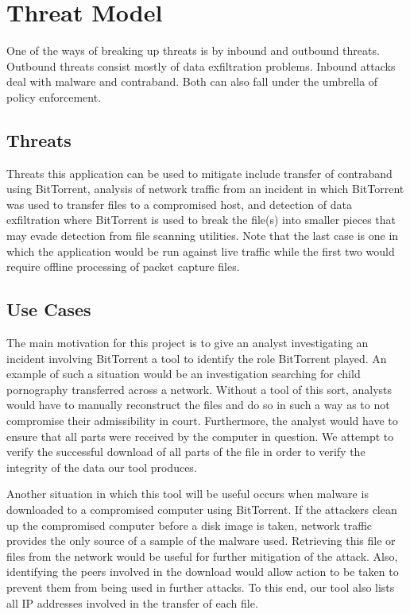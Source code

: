 \documentclass{acm_proc_article-sp}
\begin{document}
\section{Threat Model}
One of the ways of breaking up threats is by inbound and outbound threats.
Outbound threats consist mostly of data exfiltration problems.  Inbound attacks
deal with malware and contraband.  Both can also fall under the umbrella of
policy enforcement.

\subsection{Threats}
Threats this application can be used to mitigate include transfer of contraband
using BitTorrent, analysis of network traffic from an incident in which
BitTorrent was used to transfer files to a compromised host, and detection of
data exfiltration where BitTorrent is used to break the file(s) into smaller
pieces that may evade detection from file scanning utilities. Note that the
last case is one in which the application would be run against live traffic
while the first two would require offline processing of packet capture files.


\subsection{Use Cases}
The main motivation for this project is to give an analyst investigating an
incident involving BitTorrent a tool to identify the role BitTorrent played.  An
example of such a situation would be an investigation searching for child
pornography transferred across a network. Without a tool of this sort, analysts
would have to manually reconstruct the files and do so in such a way as to not
compromise their admissibility in court. Furthermore, the analyst would have to
ensure that all parts were received by the computer in question. We attempt to
verify the successful download of all parts of the file in order to verify the
integrity of the data our tool produces.

Another situation in which this tool will be useful occurs when malware is
downloaded to a compromised computer using BitTorrent. If the attackers clean up
the compromised computer before a disk image is taken, network traffic
provides the only source of a sample of the malware used. Retrieving this file
or files from the network would be useful for further mitigation of the
attack. Also, identifying the peers involved in the download would allow action
to be taken to prevent them from being used in further attacks. To this end, our
tool also lists all IP addresses involved in the transfer of each file.
\end{document}
